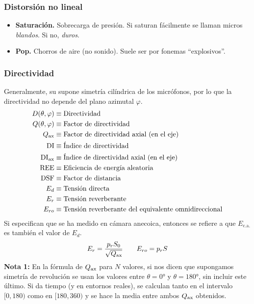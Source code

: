 \documentclass[a4paper, 8pt]{extarticle}
\begin{document}
\begin{multicols}{3}
  \subsubsection{Distorsión no lineal}
  \begin{itemize}
    \item \textbf{Saturación.} Sobrecarga de presión. Si saturan fácilmente se llaman micros \textit{blandos}. Si no, \textit{duros}.
    \item \textbf{Pop.} Chorros de aire (no sonido). Suele ser por fonemas ``explosivos''.
  \end{itemize}
  \subsubsection{Directividad}
  Generalmente, su supone simetría cilíndrica de los micrófonos, por lo que la directividad no depende del plano azimutal $\varphi$.
  \begin{align*}
    D(\theta, \varphi )          & \equiv \text{Directividad}                                         \\
    Q(\theta, \varphi )          & \equiv \text{Factor de directividad}                               \\
    Q _{\textnormal{ax}}         & \equiv \text{Factor de directividad axial (en el eje)}             \\
    \text{DI}                    & \equiv \text{Índice de directividad}                               \\
    \text{DI} _{\textnormal{ax}} & \equiv \text{Índice de directividad axial (en el eje)}             \\
    \text{REE}                   & \equiv \text{Eficiencia de energía aleatoria}                      \\
    \text{DSF}                   & \equiv \text{Factor de distancia}                                  \\
    E_d                          & \equiv \text{Tensión directa}                                      \\
    E_r                          & \equiv \text{Tensión reverberante}                                 \\
    E_{ro}                       & \equiv \text{Tensión reverberante del equivalente omnidireccional} \\
  \end{align*}
  Si especifican que se ha medido en cámara anecoica, entonces se refiere a que $E_{\text{c.a.}}$ es también el valor de $E_d$.
  \[ E_r  = \frac{p_r S_0}{\sqrt{Q _{\textnormal{ax}}}} \qquad  E_{ro} = p_r S \]
  \textbf{Nota 1:} En la fórmula de $Q_{\textnormal{ax}}$ para $N$ valores, si nos dicen que supongamos simetría de revolución se usan los valores entre $\theta = \ang{0}$ y $\theta = \ang{180}$, sin incluir este último. Si da tiempo (y en entornos reales), se calculan tanto en el intervalo $[0, 180)$ como en $[180, 360)$ y se hace la media entre ambos $Q_{\textnormal{ax}}$ obtenidos.


\end{multicols}
\end{document}
